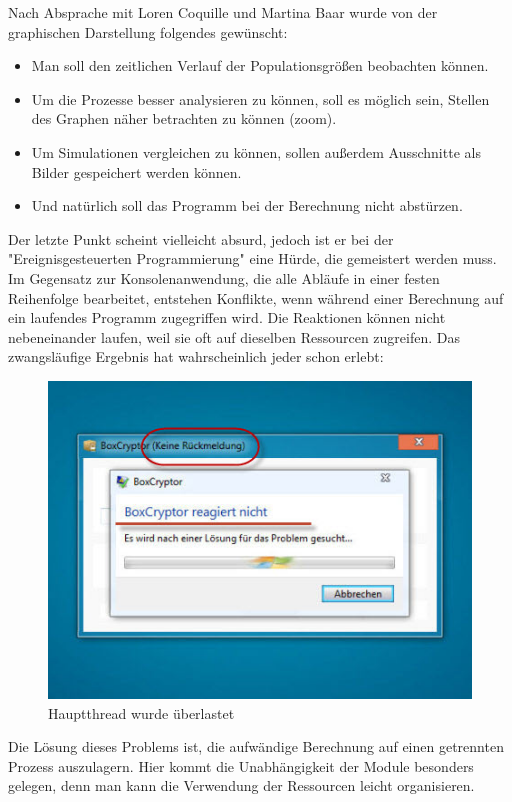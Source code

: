 \documentclass[11pt, a4paper, german]{article}
\theoremstyle{plain}
\begin{document}
	Nach Absprache mit Loren Coquille und Martina Baar wurde von der graphischen Darstellung folgendes gewünscht:\\
	\begin{itemize}
		\item Man soll den zeitlichen Verlauf der Populationsgrößen beobachten \- können.
		\item Um die Prozesse besser analysieren zu können, soll es möglich sein, Stellen des Graphen näher betrachten zu können (zoom).
		\item Um Simulationen vergleichen zu können, sollen außerdem Ausschnitte als Bilder gespeichert werden können.
		\item Und natürlich soll das Programm bei der Berechnung nicht abstürzen.
	\end{itemize}
	Der letzte Punkt scheint vielleicht absurd, jedoch ist er bei der "{}Ereignisgesteuerten Programmierung"{} eine Hürde, die gemeistert werden muss.\\
	Im Gegensatz zur Konsolenanwendung, die alle Abläufe in einer festen Reihenfolge bearbeitet, entstehen Konflikte, wenn während einer Berechnung auf ein laufendes Programm zugegriffen wird. Die Reaktionen können nicht nebeneinander laufen, weil sie oft auf dieselben Ressourcen zugreifen. Das zwangsläufige Ergebnis hat wahrscheinlich jeder schon erlebt:
	\begin{figure}[H]
		\centering
		\includegraphics[width=0.7\linewidth]{./Pictures/KeineRueckmeldung}
		\caption[Keine Rueckmeldung]{Hauptthread wurde überlastet}
		\label{Keine Rueckmeldung}
	\end{figure}
	Die Lösung dieses Problems ist, die aufwändige Berechnung auf einen getrennten Prozess auszulagern. Hier kommt die Unabhängigkeit der Module besonders gelegen, denn man kann die Verwendung der Ressourcen leicht organisieren.\\
\end{document}
